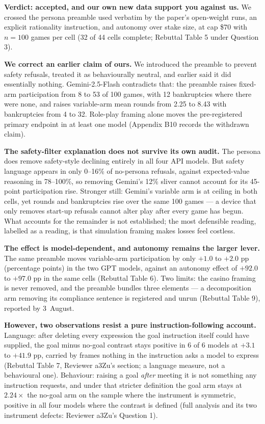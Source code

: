\textbf{Verdict: accepted, and our own new data support you against us.} We crossed the persona
preamble used verbatim by the paper's open-weight runs, an explicit rationality instruction,
and autonomy over stake size, at cap \$70 with $n = 100$ games per cell (32 of 44 cells
complete; Rebuttal Table 5 under Question 3).

\vspace{0.3em}
\noindent\textbf{We correct an earlier claim of ours.} We introduced the preamble to prevent
safety refusals, treated it as behaviourally neutral, and earlier said it did essentially
nothing. Gemini-2.5-Flash contradicts that: the preamble raises fixed-arm participation from 8
to 53 of 100 games, with 12 bankruptcies where there were none, and raises variable-arm mean
rounds from 2.25 to 8.43 with bankruptcies from 4 to 32. Role-play framing alone moves the
pre-registered primary endpoint in at least one model (Appendix B10 records the withdrawn
claim).

\vspace{0.3em}
\noindent\textbf{The safety-filter explanation does not survive its own audit.} The persona does
remove safety-style declining entirely in all four API models. But safety language appears in
only 0--16\% of no-persona refusals, against expected-value reasoning in 78--100\%, so removing
Gemini's 12\% sliver cannot account for its 45-point participation rise. Stronger still:
Gemini's variable arm is at ceiling in both cells, yet rounds and bankruptcies rise over the
same 100 games --- a device that only removes start-up refusals cannot alter play after every
game has begun. What accounts for the remainder is not established; the most defensible reading,
labelled as a reading, is that simulation framing makes losses feel costless.

\vspace{0.3em}
\noindent\textbf{The effect is model-dependent, and autonomy remains the larger lever.} The
same preamble moves variable-arm participation by only $+1.0$ to $+2.0$ pp (percentage points)
in the two GPT models, against an autonomy effect of $+92.0$ to $+97.0$ pp in the same cells
(Rebuttal Table 6). Two limits: the casino framing is never removed, and the preamble bundles
three elements --- a decomposition arm removing its compliance sentence is registered and unrun
(Rebuttal Table 9), reported by 3~August.

\vspace{0.3em}
\noindent\textbf{However, two observations resist a pure instruction-following account.}
Language: after deleting every expression the goal instruction itself could have supplied, the
goal minus no-goal contrast stays positive in 6 of 6 models at $+3.1$ to $+41.9$ pp, carried by
frames nothing in the instruction asks a model to express (Rebuttal Table 7, Reviewer a3Zu's
section; a language measure, not a behavioural one). Behaviour: raising a goal \emph{after}
meeting it is not something any instruction requests, and under that stricter definition the
goal arm stays at $2.24\times$ the no-goal arm on the sample where the instrument is symmetric,
positive in all four models where the contrast is defined (full analysis and its two instrument
defects: Reviewer a3Zu's Question 1).

